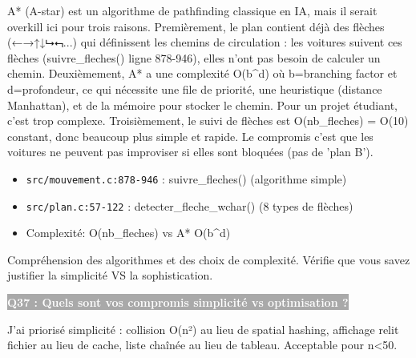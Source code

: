 \documentclass[12pt,a4paper]{article}
\newcommand{\question}[1]{%
    \vspace{0.5cm}
    \noindent\colorbox{darkgray}{\textcolor{white}{\textbf{#1}}}
    \vspace{0.3cm}
}
\begin{document}
\begin{reponse_longue}
A* (A-star) est un algorithme de pathfinding classique en IA, mais il serait overkill ici pour trois raisons. Premièrement, le plan contient déjà des flèches (←→↑↓⮡⮢...) qui définissent les chemins de circulation : les voitures suivent ces flèches (suivre\_fleches() ligne 878-946), elles n'ont pas besoin de calculer un chemin. Deuxièmement, A* a une complexité O(b\textasciicircum{}d) où b=branching factor et d=profondeur, ce qui nécessite une file de priorité, une heuristique (distance Manhattan), et de la mémoire pour stocker le chemin. Pour un projet étudiant, c'est trop complexe. Troisièmement, le suivi de flèches est O(nb\_fleches) = O(10) constant, donc beaucoup plus simple et rapide. Le compromis c'est que les voitures ne peuvent pas improviser si elles sont bloquées (pas de 'plan B').
\end{reponse_longue}

\begin{reference_code}
\begin{itemize}
    \item \texttt{src/mouvement.c:878-946} : suivre\_fleches() (algorithme simple)
    \item \texttt{src/plan.c:57-122} : detecter\_fleche\_wchar() (8 types de flèches)
    \item Complexité: O(nb\_fleches) vs A* O(b\textasciicircum{}d)
\end{itemize}
\end{reference_code}

\begin{objectif_prof}
Compréhension des algorithmes et des choix de complexité. Vérifie que vous savez justifier la simplicité VS la sophistication.
\end{objectif_prof}

\question{Q37 : Quels sont vos compromis simplicité vs optimisation ?}

\begin{reponse_courte}
J'ai priorisé simplicité : collision O(n²) au lieu de spatial hashing, affichage relit fichier au lieu de cache, liste chaînée au lieu de tableau. Acceptable pour n<50.
\end{reponse_courte}
\end{document}
